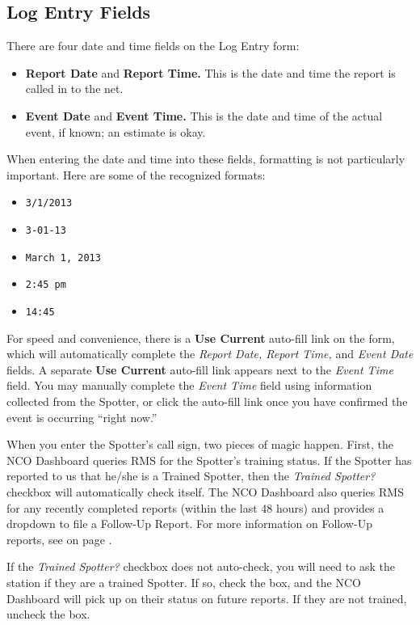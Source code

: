 \documentclass[pdflatex,letterpaper,twoside,12pt]{book}
\begin{document}
\subsection{Log Entry Fields}

There are four date and time fields on the Log Entry form:

\begin{itemize}
\item \textbf{Report Date} and \textbf{Report Time.}  This is the date and time the report is called in to the net.
\item \textbf{Event Date} and \textbf{Event Time.}  This is the date and time of the actual event, if known;  an estimate is okay.
\end{itemize}

When entering the date and time into these fields, formatting is not particularly important.  Here are some of the recognized formats:

\begin{itemize}
\item \verb|3/1/2013|
\item \verb|3-01-13|
\item \verb|March 1, 2013|
\item \verb|2:45 pm|
\item \verb|14:45|
\end{itemize}

For speed and convenience, there is a \textbf{Use Current} auto-fill link on the form, which will automatically complete the \emph{Report Date, Report Time,} and \emph{Event Date} fields.  A separate \textbf{Use Current} auto-fill link appears next to the \emph{Event Time} field.  You may manually complete the \emph{Event Time} field using information collected from the Spotter, or click the auto-fill link once you have confirmed the event is occurring ``right now.''

When you enter the Spotter's call sign, two pieces of magic happen.  First, the NCO Dashboard queries RMS for the Spotter's training status.  If the Spotter has reported to us that he/she is a Trained Spotter, then the \emph{Trained Spotter?} checkbox will automatically check itself.  The NCO Dashboard also queries RMS for any recently completed reports (within the last 48 hours) and provides a dropdown to file a Follow-Up Report.  For more information on Follow-Up reports, see  on page \pageref{follow-up-reports}.

If the \emph{Trained Spotter?} checkbox does not auto-check, you will need to ask the station if they are a trained Spotter.  If so, check the box, and the NCO Dashboard will pick up on their status on future reports.  If they are not trained, uncheck the box.
\end{document}
